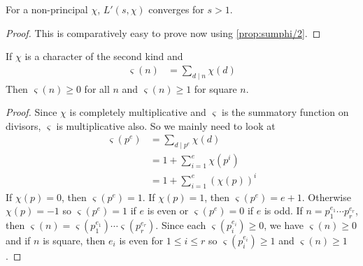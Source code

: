 \documentclass[elemannt.tex]{subfile}
\begin{document}
		\begin{proposition}\label{prop:nonprincipaldirichletconverges}
			For a non-principal $\chi$, $L'(s, \chi)$ converges for $s>1$.
		\end{proposition}

		\begin{proof}
			This is comparatively easy to prove now using \autoref{prop:sumphi/2}.
		\end{proof}

		\begin{proposition}\label{pro:second-char-geq1}
			If $\chi$ is a character of the second kind and
				\begin{align*}
					\varsigma(n)
						& = \sum_{d\mid n}\chi(d)
				\end{align*}
			Then $\varsigma(n)\geq 0$ for all $n$ and $\varsigma(n)\geq 1$ for square $n$.
		\end{proposition}

		\begin{proof}
			Since $\chi$ is completely multiplicative and $\varsigma$ is the summatory function on divisors, $\varsigma$ is multiplicative also. So we mainly need to look at
				\begin{align*}
					\varsigma(p^{e})
						& = \sum_{d\mid p^{e}}\chi(d)\\
						& = 1+\sum_{i=1}^{e}\chi(p^{i})\\
						& = 1+\sum_{i=1}^{e}(\chi(p))^{i}
				\end{align*}
			If $\chi(p)=0$, then $\varsigma(p^{e})=1$. If $\chi(p)=1$, then $\varsigma(p^{e})=e+1$. Otherwise $\chi(p)=-1$ so $\varsigma(p^{e})=1$ if $e$ is even or $\varsigma(p^{e})=0$ if $e$ is odd. If $n=p_{1}^{e_{1}}\cdots p_{r}^{e_{r}}$, then $\varsigma(n)=\varsigma(p_{1}^{e_{1}})\cdots\varsigma(p_{r}^{e_{r}})$. Since each $\varsigma(p_{i}^{e_{i}})\geq0$, we have $\varsigma(n)\geq0$ and if $n$ is square, then $e_{i}$ is even for $1\leq i\leq r$ so $\varsigma(p_{i}^{e_{i}})\geq 1$ and $\varsigma(n)\geq1$.
		\end{proof}
\end{document}
